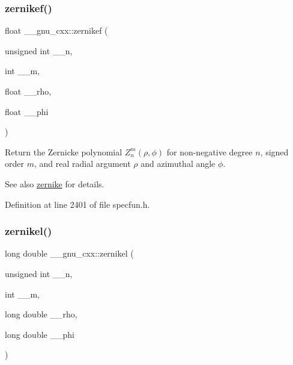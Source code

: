 \mbox{\label{group__gnu__math__spec__func_gababce1066ecef7258070b9b7fcea975f}} 
\subsubsection{\texorpdfstring{zernikef()}{zernikef()}}
{\footnotesize\ttfamily float \+\_\+\+\_\+gnu\+\_\+cxx\+::zernikef (\begin{DoxyParamCaption}\item[{unsigned int}]{\+\_\+\+\_\+n,  }\item[{int}]{\+\_\+\+\_\+m,  }\item[{float}]{\+\_\+\+\_\+rho,  }\item[{float}]{\+\_\+\+\_\+phi }\end{DoxyParamCaption})\hspace{0.3cm}{\ttfamily [inline]}}

Return the Zernicke polynomial $ Z_n^m(\rho,\phi) $ for non-\/negative degree $ n $, signed order $ m $, and real radial argument $ \rho $ and azimuthal angle $ \phi $.

\begin{DoxySeeAlso}{See also}
\hyperlink{group__gnu__math__spec__func_gaaed33f29c1eb1d2c5b9590fe2e57151c}{zernike} for details. 
\end{DoxySeeAlso}


Definition at line 2401 of file specfun.\+h.

\mbox{\label{group__gnu__math__spec__func_ga9236dd8545b448da9cb05dd8b7cf6811}} 
\subsubsection{\texorpdfstring{zernikel()}{zernikel()}}
{\footnotesize\ttfamily long double \+\_\+\+\_\+gnu\+\_\+cxx\+::zernikel (\begin{DoxyParamCaption}\item[{unsigned int}]{\+\_\+\+\_\+n,  }\item[{int}]{\+\_\+\+\_\+m,  }\item[{long double}]{\+\_\+\+\_\+rho,  }\item[{long double}]{\+\_\+\+\_\+phi }\end{DoxyParamCaption})\hspace{0.3cm}{\ttfamily [inline]}}

